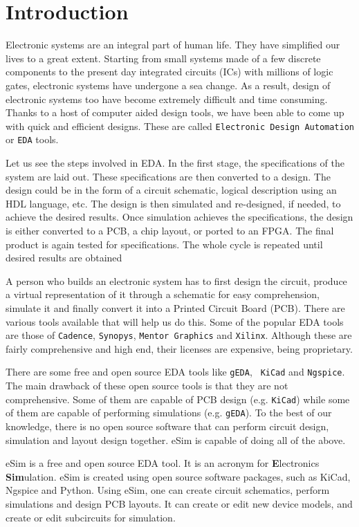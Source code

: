 \chapter{Introduction}
\thispagestyle{empty}
Electronic systems are an integral part of human life. They have
simplified our lives to a great extent. Starting from small systems
made of a few discrete components to the present day integrated
circuits (ICs) with millions of logic gates, electronic systems have
undergone a sea change. As a result, design of electronic systems too
have become extremely difficult and time consuming. Thanks to a host
of computer aided design tools, we have been able to come up with
quick and efficient designs. These are called {\tt Electronic Design
  Automation} or {\tt EDA} tools.

Let us see the steps involved in EDA. In the
first stage, the specifications of the system are laid out. These
specifications are then converted to a design. The design could be in
the form of a circuit schematic, logical description using an HDL
language, etc. The design is then simulated and re-designed, if needed,
to achieve the desired results. Once simulation achieves the
specifications, the design is either converted to a PCB, a chip
layout, or ported to an FPGA. The final product is again tested for
specifications. The whole cycle is repeated until desired results are
obtained %

A person who builds an electronic system has to first design the
circuit, produce a virtual representation of it through a schematic
for easy comprehension, simulate it and finally convert it into a
Printed Circuit Board (PCB).  There are various tools
available that will help us do this.  Some of the popular EDA tools 
are those of {\tt Cadence}, {\tt Synopys}, {\tt Mentor Graphics} and 
{\tt Xilinx}. Although these are fairly comprehensive and high end,
their licenses are expensive, being proprietary.

There are some free and open source EDA tools like {\tt gEDA}, {\tt
  KiCad} and {\tt Ngspice}. The main drawback of these open source
tools is that they are not comprehensive. Some of them are capable of
PCB design (e.g. {\tt KiCad}) while some of them are capable of
performing simulations (e.g. {\tt gEDA}).  To the best of our
knowledge, there is no open source software that can perform circuit
design, simulation and layout design together. eSim is capable of
doing all of the above. 

eSim is a free and open source EDA tool.  It is an
acronym for \textbf{E}lectronics \textbf{Sim}ulation. eSim is created 
using open source software packages, such as KiCad, Ngspice and
Python.   
Using eSim, one can create circuit schematics, perform simulations
and design PCB layouts. It can create or edit new device models, and
create or edit subcircuits for simulation. 

